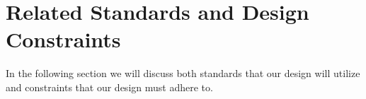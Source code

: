 \section{Related Standards and Design Constraints}
In the following section we will discuss both standards that our design will utilize and constraints that our design must adhere to.


